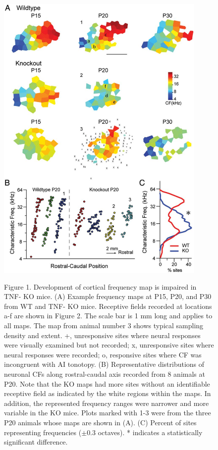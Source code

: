 \begin{figure}
	\centering
		\includegraphics[width=4in]{images/C3F1}
	\begin{changemargin}{1in}{1in}
	\footnotesize{Figure 1. Development of cortical frequency map is impaired in TNF-\textalpha{} KO mice. (A) Example frequency maps at P15, P20, and P30 from WT and TNF-\textalpha{} KO mice. Receptive fields recorded at locations a-f are shown in Figure 2. The scale bar is 1 mm long and applies to all maps. The map from animal number 3 shows typical sampling density and extent. +, unresponsive sites where neural responses were visually examined but not recorded; x, unresponsive sites where neural responses were recorded; o, responsive sites where CF was incongruent with AI tonotopy. (B) Representative distributions of neuronal CFs along rostral-caudal axis recorded from 8 animals at P20. Note that the KO maps had more sites without an identifiable receptive field as indicated by the white regions within the maps. In addition, the represented frequency ranges were narrower and more variable in the KO mice. Plots marked with 1-3 were from the three P20 animals whose maps are shown in (A). (C) Percent of sites representing frequencies ($\pm0.3$ octaves). * indicates a statistically significant difference.}
	\end{changemargin}
\end{figure}

